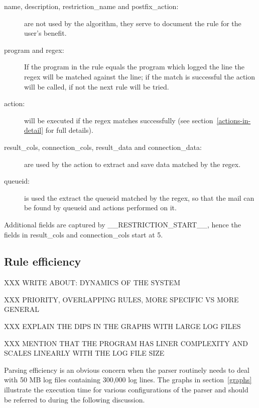 \documentclass[a4paper,12pt,draft]{article}
\begin{document}
\begin{description}

    \item [name, description, restriction\_name and postfix\_action:] are
        not \newline used by the algorithm, they serve to document the rule
        for the user's benefit.

    \item [program and regex:] If the program in the rule equals the
        program which logged the line the regex will be matched against the
        line; if the match is successful the action will be called, if not
        the next rule will be tried.

    \item [action:] will be executed if the regex matches successfully (see
        section~\ref{actions-in-detail} for full details).

    \item [result\_cols, connection\_cols, result\_data and
        connection\_data:] are \newline used by the action to extract and
        save data matched by the regex.

    \item [queueid:] is used the extract the queueid matched by the regex,
        so that the mail can be found by queueid and actions performed on
        it.

\end{description}

Additional fields are captured by \_\_RESTRICTION\_START\_\_, hence the
fields in result\_cols and connection\_cols start at 5.

        
\subsection{Rule efficiency}

\label{rule efficiency}

XXX WRITE ABOUT\@: DYNAMICS OF THE SYSTEM

XXX PRIORITY, OVERLAPPING RULES, MORE SPECIFIC VS \newline MORE GENERAL

XXX EXPLAIN THE DIPS IN THE GRAPHS WITH LARGE LOG FILES

XXX MENTION THAT THE PROGRAM HAS LINER COMPLEXITY AND SCALES LINEARLY WITH
THE LOG FILE SIZE

Parsing efficiency is an obvious concern when the parser routinely needs to
deal with 50 MB log files containing 300,000 log lines.  The graphs in
section~\ref{graphs} illustrate the execution time for various
configurations of the parser and should be referred to during the following
discussion.
\end{document}

